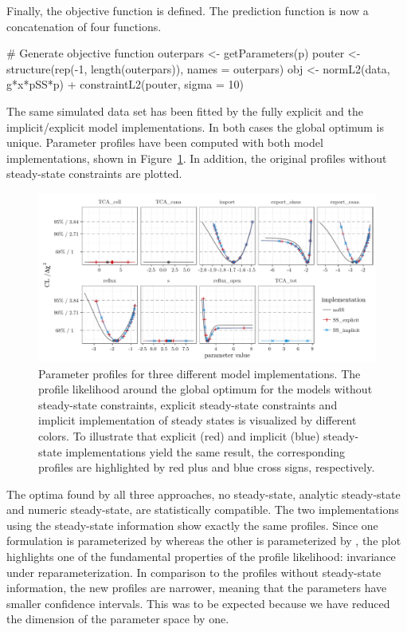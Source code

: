 \documentclass[article]{jss}
\begin{document}
Finally, the objective function is defined. The prediction function is now a concatenation of four functions.

\begin{CodeChunk}
\begin{CodeInput}
# Generate objective function
outerpars <- getParameters(p)
pouter <- structure(rep(-1, length(outerpars)), names = outerpars)
obj <- normL2(data, g*x*pSS*p) + constraintL2(pouter, sigma = 10)
\end{CodeInput}
\end{CodeChunk}

The same simulated data set has been fitted by the fully explicit and the implicit/explicit model implementations. In both cases the global optimum is unique. Parameter profiles have been computed with both model implementations, shown in Figure~\ref{fig:allprofiles}. In addition, the original profiles without steady-state constraints are plotted.
\begin{figure}[ht]
	\centering
	\includegraphics[width = \textwidth]{images/figure8}
	\caption{Parameter profiles for three different model implementations. The profile likelihood around the global optimum for the models without steady-state constraints, explicit steady-state constraints and implicit implementation of steady states is visualized by different colors. To illustrate that explicit (red) and implicit (blue) steady-state implementations yield the same result, the corresponding profiles are highlighted by red plus and blue cross signs, respectively.}
	\label{fig:allprofiles}
\end{figure}
The optima found by all three approaches, no steady-state, analytic steady-state and numeric steady-state, are statistically compatible. The two implementations using the steady-state information show exactly the same profiles. Since one formulation is parameterized by  whereas the other is parameterized by , the plot highlights one of the fundamental properties of the profile likelihood: invariance under reparameterization. In comparison to the profiles without steady-state information, the new profiles are narrower, meaning that the parameters have smaller confidence intervals. This was to be expected because we have reduced the dimension of the parameter space by one.
\end{document}
